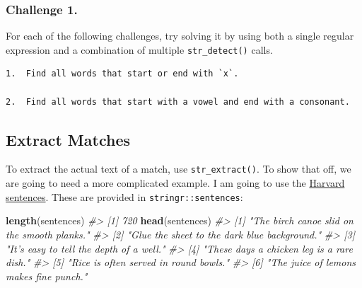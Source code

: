 \documentclass[]{book}
\newenvironment{Shaded}{\begin{snugshade}}{\end{snugshade}}
\newcommand{\KeywordTok}[1]{\textcolor[rgb]{0.13,0.29,0.53}{\textbf{#1}}}
\newcommand{\DataTypeTok}[1]{\textcolor[rgb]{0.13,0.29,0.53}{#1}}
\newcommand{\StringTok}[1]{\textcolor[rgb]{0.31,0.60,0.02}{#1}}
\newcommand{\CommentTok}[1]{\textcolor[rgb]{0.56,0.35,0.01}{\textit{#1}}}
\newcommand{\OperatorTok}[1]{\textcolor[rgb]{0.81,0.36,0.00}{\textbf{#1}}}
\newcommand{\NormalTok}[1]{#1}
\begin{document}
\begin{Shaded}
\end{Shaded}

\subsubsection*{Challenge 1.}\label{challenge-1.-12}

For each of the following challenges, try solving it by using both a
single regular expression and a combination of multiple
\texttt{str\_detect()} calls.

\begin{verbatim}
1.  Find all words that start or end with `x`.

2.  Find all words that start with a vowel and end with a consonant.
\end{verbatim}

\subsection{Extract Matches}\label{extract-matches}

To extract the actual text of a match, use \texttt{str\_extract()}. To
show that off, we are going to need a more complicated example. I am
going to use the
\href{https://en.wikipedia.org/wiki/Harvard_sentences}{Harvard
sentences}. These are provided in \texttt{stringr::sentences}:

\begin{Shaded}
\begin{Highlighting}[]
\KeywordTok{length}\NormalTok{(sentences)}
\CommentTok{#> [1] 720}
\KeywordTok{head}\NormalTok{(sentences)}
\CommentTok{#> [1] "The birch canoe slid on the smooth planks." }
\CommentTok{#> [2] "Glue the sheet to the dark blue background."}
\CommentTok{#> [3] "It's easy to tell the depth of a well."     }
\CommentTok{#> [4] "These days a chicken leg is a rare dish."   }
\CommentTok{#> [5] "Rice is often served in round bowls."       }
\CommentTok{#> [6] "The juice of lemons makes fine punch."}
\end{Highlighting}
\end{Shaded}
\end{document}
